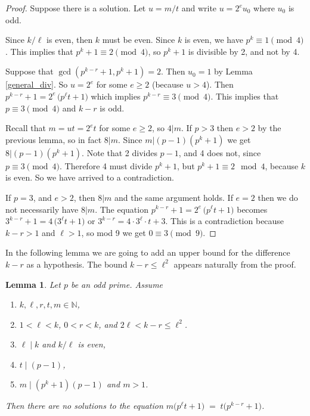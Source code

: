 \documentclass[oneside,a4paper,12pt]{article}
\theoremstyle{plain} %
\newtheorem{lemma}[theorem]{Lemma}
\theoremstyle{definition} %
\begin{document}
\begin{proof}
Suppose there is a solution.
Let $u=m/t$ and write $u=2^eu_0$ where $u_0$ is odd.

Since $k/\ell$ is even, then $k$ must be even.
Since  $k$ is even, we have 
$p^k\equiv 1 \pmod4$.
This implies that $p^k+1\equiv 2 \pmod4$, so
$p^k+1$ is divisible by 2, and not by 4.


Suppose  that 
$\gcd(p^{k-r}+1,p^k+1)=2$.
Then $u_0=1$ by Lemma \ref{general_div}.
So $u=2^e$ for some $e\ge 2$ (because $u>4$).
Then
$p^{k-r}+1 = 2^e\,\bigl(p^\ell t+1\bigr)$
which implies $p^{k-r}\equiv 3 \pmod4$.
This implies that $p\equiv 3 \pmod4$ and $k-r$ is odd.


Recall that  $m=ut=2^et$ for some $e\ge 2$, so $4|m$.
If $p>3$ then $e>2$ by the previous lemma,
so in fact $8|m$. 
Since $m|(p-1)(p^k+1)$ we get $8|(p-1)(p^k+1)$.
Note that 2 divides $p-1$, and 4 does not, since $p\equiv 3 \pmod4$.
Therefore 4 must divide $p^k+1$, but $p^k+1  \equiv 2 \mod 4$, because $k$ is even. So we  have arrived to a contradiction.

If $p=3$, and $e>2$, then $8|m$ and the same argument holds.
If $e=2$ then we do not necessarily have $8|m$.
The equation $p^{k-r}+1 = 2^e\,\bigl(p^\ell t+1\bigr)$ becomes
$3^{k-r}+1 = 4\,\bigl(3^\ell t+1\bigr)$
or
$3^{k-r} = 4\cdot 3^\ell \cdot t+3$.
This is a contradiction because $k-r>1$ and $\ell >1$,
so mod 9 we get $0\equiv 3 \pmod{9}$.
\end{proof}






In the following lemma we are going to add an upper bound for the difference $k-r$ as a hypothesis. The bound $k-r\leq \ell^2$ appears naturally from the proof.


\begin{lemma}\label{general_div3}
Let $p$ be an odd prime. Assume
\begin{enumerate}
  \item $k,\ell,r,t,m\in\mathbb{N}$, 
  \item $1<\ell < k$,  $0<r<k$,  and
$2\ell < k-r\le \ell^2$.
  \item $\ell\mid k$ and $k/\ell$ is even,
  \item $t\mid (p-1)$,
  \item $m\mid (p^k+1)(p-1)$ and $m>1$.
\end{enumerate}
 Then there are no solutions
to the equation
$m\bigl(p^\ell t+1\bigr) \;=\; t\bigl(p^{k-r}+1\bigr)$.
\end{lemma}
\end{document}
